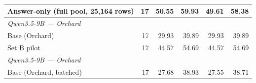 \begin{table}[t]
{\begin{tabular}{lrrrrr}
Answer-only (full pool, 25,164 rows) & 17 & 50.55 & 59.93 & 49.61 & 58.38 \\
\midrule
\multicolumn{6}{l}{\textit{Qwen3.5-9B --- Orchard}} \\
Base (Orchard) & 17 & 29.93 & 39.89 & 29.93 & 39.89 \\
Set B pilot & 17 & 44.57 & 54.69 & 44.57 & 54.69 \\
\midrule
\multicolumn{6}{l}{\textit{Qwen3.5-9B --- Orchard}} \\
Base (Orchard, batched) & 17 & 27.68 & 38.93 & 27.55 & 38.71 \\

\end{tabular}}
\end{table}
